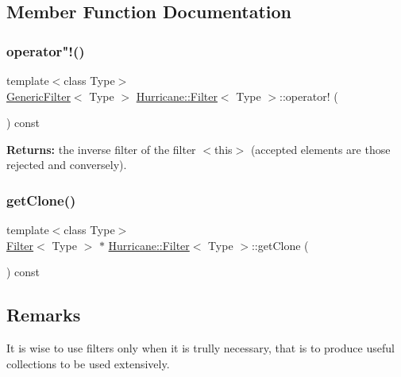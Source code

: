 \subsection{Member Function Documentation}
\mbox{\label{classHurricane_1_1Filter_a90c1a8c4caf6c6018ff50f5b9754e061}} 
\subsubsection{\texorpdfstring{operator"!()}{operator!()}}
{\footnotesize\ttfamily template$<$class Type$>$ \\
\mbox{\hyperlink{classHurricane_1_1GenericFilter}{Generic\+Filter}}$<$ Type $>$ \mbox{\hyperlink{classHurricane_1_1Filter}{Hurricane\+::\+Filter}}$<$ Type $>$\+::operator! (\begin{DoxyParamCaption}{ }\end{DoxyParamCaption}) const\hspace{0.3cm}{\ttfamily [inline]}}

{\bfseries Returns\+:} the inverse filter of the filter {\ttfamily $<$this$>$} (accepted elements are those rejected and conversely). \mbox{\label{classHurricane_1_1Filter_a596cad421801115efbc5c541f8d29e0b}} 
\subsubsection{\texorpdfstring{get\+Clone()}{getClone()}}
{\footnotesize\ttfamily template$<$class Type$>$ \\
\mbox{\hyperlink{classHurricane_1_1Filter}{Filter}}$<$ Type $>$ $\ast$ \mbox{\hyperlink{classHurricane_1_1Filter}{Hurricane\+::\+Filter}}$<$ Type $>$\+::get\+Clone (\begin{DoxyParamCaption}{ }\end{DoxyParamCaption}) const\hspace{0.3cm}{\ttfamily [pure virtual]}}

\hypertarget{classHurricane_1_1Filter_secFilterRemarks}{}\subsection{Remarks}\label{classHurricane_1_1Filter_secFilterRemarks}
It is wise to use filters only when it is trully necessary, that is to produce useful collections to be used extensively.


